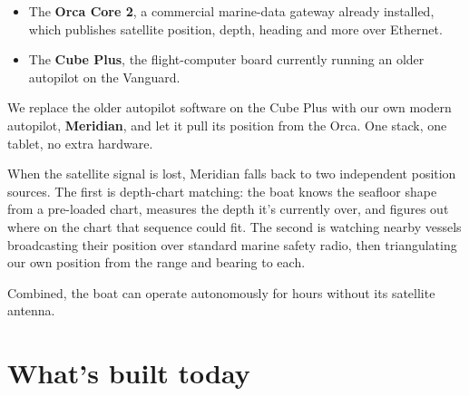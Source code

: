 \documentclass[10pt,a4paper]{article}
\begin{document}
\begin{itemize}
\item The \textbf{Orca Core 2}, a commercial marine-data gateway already installed, which publishes satellite position, depth, heading and more over Ethernet.
\item The \textbf{Cube Plus}, the flight-computer board currently running an older autopilot on the Vanguard.
\end{itemize}

We replace the older autopilot software on the Cube Plus with our own
modern autopilot, \textbf{Meridian}, and let it pull its position from
the Orca. One stack, one tablet, no extra hardware.

When the satellite signal is lost, Meridian falls back to two
independent position sources. The first is depth-chart matching: the
boat knows the seafloor shape from a pre-loaded chart, measures the
depth it's currently over, and figures out where on the chart that
sequence could fit. The second is watching nearby vessels broadcasting
their position over standard marine safety radio, then triangulating
our own position from the range and bearing to each.

Combined, the boat can operate autonomously for hours without its
satellite antenna.

\pagebreak

\section{What's built today}
\end{document}
